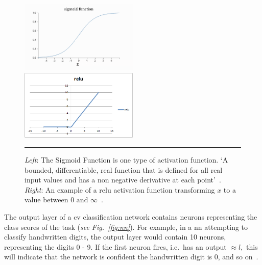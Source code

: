 \begin{figure}[H]
    \includegraphics[width=0.5\textwidth]{media/literature/sigmoid.png}
    \includegraphics[width=0.5\textwidth]{media/literature/relu.png}
    \rule{35em}{0.5pt}
    \caption[Examples of Activation Functions]{\textit{Left}: The Sigmoid Function is one type of activation function. `A bounded, differentiable, real function that is defined for all real input values and has a non negative derivative at each point'~\citep{Han1995}. \textit{Right}: An example of a \Gls{relu} activation function transforming $x$ to a value between $0 \text{ and } \infty$~\citep{Malik2019activation}.}\label{fig:activation}
\end{figure}


The output layer of a \gls{cv} classification network contains neurons representing the class
scores of the task (\textit{see Fig.~\ref{fig:nn}}). For example, in a \gls{nn} attempting to classify handwritten
digits, the output layer would contain 10 neurons, representing the digits 0 - 9.
If the first neuron fires, i.e.\ has an output $\approx l,$ this will indicate that the
network is confident the handwritten digit is 0, and so on~\citep{Nielsen2015}.

